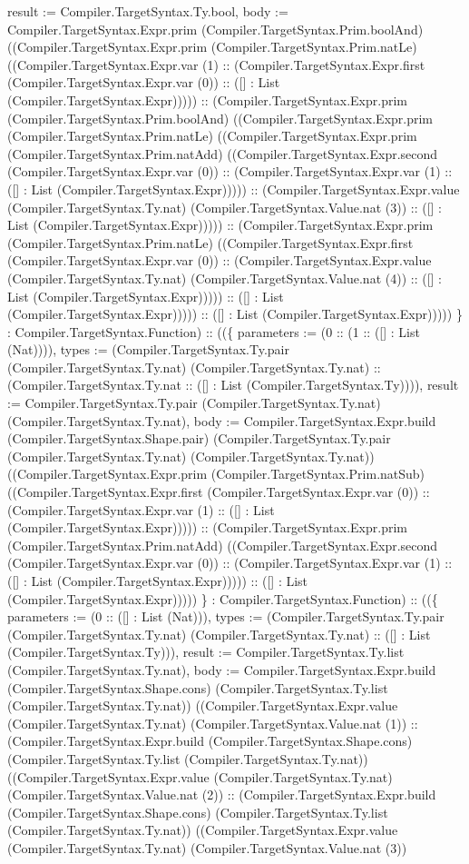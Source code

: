 \documentclass[11pt]{article}
\begin{document}
result := Compiler.TargetSyntax.Ty.bool, body := Compiler.TargetSyntax.Expr.prim (Compiler.TargetSyntax.Prim.boolAnd) ((Compiler.TargetSyntax.Expr.prim (Compiler.TargetSyntax.Prim.natLe) ((Compiler.TargetSyntax.Expr.var (1) :: (Compiler.TargetSyntax.Expr.first (Compiler.TargetSyntax.Expr.var (0)) :: ([] : List (Compiler.TargetSyntax.Expr))))) :: (Compiler.TargetSyntax.Expr.prim (Compiler.TargetSyntax.Prim.boolAnd) ((Compiler.TargetSyntax.Expr.prim (Compiler.TargetSyntax.Prim.natLe) ((Compiler.TargetSyntax.Expr.prim (Compiler.TargetSyntax.Prim.natAdd) ((Compiler.TargetSyntax.Expr.second (Compiler.TargetSyntax.Expr.var (0)) :: (Compiler.TargetSyntax.Expr.var (1) :: ([] : List (Compiler.TargetSyntax.Expr))))) :: (Compiler.TargetSyntax.Expr.value (Compiler.TargetSyntax.Ty.nat) (Compiler.TargetSyntax.Value.nat (3)) :: ([] : List (Compiler.TargetSyntax.Expr))))) :: (Compiler.TargetSyntax.Expr.prim (Compiler.TargetSyntax.Prim.natLe) ((Compiler.TargetSyntax.Expr.first (Compiler.TargetSyntax.Expr.var (0)) :: (Compiler.TargetSyntax.Expr.value (Compiler.TargetSyntax.Ty.nat) (Compiler.TargetSyntax.Value.nat (4)) :: ([] : List (Compiler.TargetSyntax.Expr))))) :: ([] : List (Compiler.TargetSyntax.Expr))))) :: ([] : List (Compiler.TargetSyntax.Expr))))) \} : Compiler.TargetSyntax.Function) :: ((\{ parameters := (0 :: (1 :: ([] : List (Nat)))), types := (Compiler.TargetSyntax.Ty.pair (Compiler.TargetSyntax.Ty.nat) (Compiler.TargetSyntax.Ty.nat) :: (Compiler.TargetSyntax.Ty.nat :: ([] : List (Compiler.TargetSyntax.Ty)))), result := Compiler.TargetSyntax.Ty.pair (Compiler.TargetSyntax.Ty.nat) (Compiler.TargetSyntax.Ty.nat), body := Compiler.TargetSyntax.Expr.build (Compiler.TargetSyntax.Shape.pair) (Compiler.TargetSyntax.Ty.pair (Compiler.TargetSyntax.Ty.nat) (Compiler.TargetSyntax.Ty.nat)) ((Compiler.TargetSyntax.Expr.prim (Compiler.TargetSyntax.Prim.natSub) ((Compiler.TargetSyntax.Expr.first (Compiler.TargetSyntax.Expr.var (0)) :: (Compiler.TargetSyntax.Expr.var (1) :: ([] : List (Compiler.TargetSyntax.Expr))))) :: (Compiler.TargetSyntax.Expr.prim (Compiler.TargetSyntax.Prim.natAdd) ((Compiler.TargetSyntax.Expr.second (Compiler.TargetSyntax.Expr.var (0)) :: (Compiler.TargetSyntax.Expr.var (1) :: ([] : List (Compiler.TargetSyntax.Expr))))) :: ([] : List (Compiler.TargetSyntax.Expr))))) \} : Compiler.TargetSyntax.Function) :: ((\{ parameters := (0 :: ([] : List (Nat))), types := (Compiler.TargetSyntax.Ty.pair (Compiler.TargetSyntax.Ty.nat) (Compiler.TargetSyntax.Ty.nat) :: ([] : List (Compiler.TargetSyntax.Ty))), result := Compiler.TargetSyntax.Ty.list (Compiler.TargetSyntax.Ty.nat), body := Compiler.TargetSyntax.Expr.build (Compiler.TargetSyntax.Shape.cons) (Compiler.TargetSyntax.Ty.list (Compiler.TargetSyntax.Ty.nat)) ((Compiler.TargetSyntax.Expr.value (Compiler.TargetSyntax.Ty.nat) (Compiler.TargetSyntax.Value.nat (1)) :: (Compiler.TargetSyntax.Expr.build (Compiler.TargetSyntax.Shape.cons) (Compiler.TargetSyntax.Ty.list (Compiler.TargetSyntax.Ty.nat)) ((Compiler.TargetSyntax.Expr.value (Compiler.TargetSyntax.Ty.nat) (Compiler.TargetSyntax.Value.nat (2)) :: (Compiler.TargetSyntax.Expr.build (Compiler.TargetSyntax.Shape.cons) (Compiler.TargetSyntax.Ty.list (Compiler.TargetSyntax.Ty.nat)) ((Compiler.TargetSyntax.Expr.value (Compiler.TargetSyntax.Ty.nat) (Compiler.TargetSyntax.Value.nat (3)) 
\end{document}
